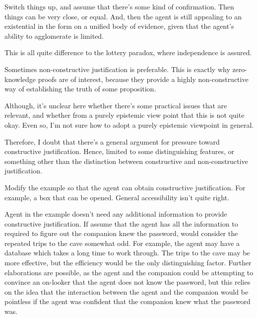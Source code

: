 \documentclass[10pt]{article}
\begin{document}
Switch things up, and assume that there's some kind of confirmation.
Then things can be very close, or equal.
And, then the agent is still appealing to an existential in the form on a unified body of evidence, given that the agent's ability to agglomerate is limited.

This is all quite difference to the lottery paradox, where independence is assured.

\begin{note}
  Sometimes non-constructive justification is preferable.
  This is exactly why zero-knowledge proofs are of interest, because they provide a highly non-constructive way of establishing the truth of some proposition.

  Although, it's unclear here whether there's some practical issues that are relevant, and whether from a purely epistemic view point that this is not quite okay.
  Even so, I'm not sure how to adopt a purely epistemic viewpoint in general.

  Therefore, I doubt that there's a general argument for pressure toward constructive justification.
  Hence, limited to some distinguishing features, or something other than the distinction between constructive and non-constructive justification.

  Modify the example so that the agent can obtain constructive justification.
  For example, a box that can be opened.
  General accessibility isn't quite right.

  Agent in the example doesn't need any additional information to provide constructive justification.
  If assume that the agent has all the information to required to figure out the companion knew the password, would consider the repeated trips to the cave somewhat odd.
  For example, the agent may have a database which takes a long time to work through.
  The trips to the cave may be more effective, but the efficiency would be the only distinguishing factor.
  Further elaborations are possible, as the agent and the companion could be attempting to convince an on-looker that the agent does not know the password, but this relies on the idea that the interaction between the agent and the companion would be pointless if the agent was confident that the companion knew what the password was.
\end{note}
\end{document}
